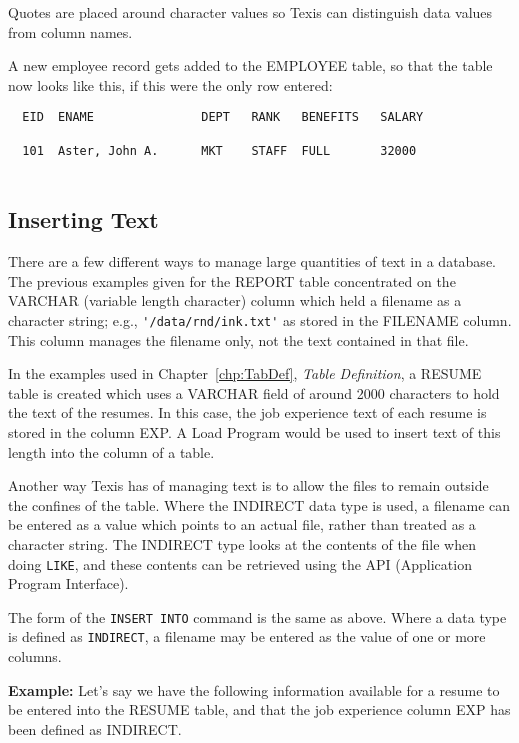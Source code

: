 Quotes are placed around character values so Texis can distinguish
data values from column names.

A new employee record gets added to the EMPLOYEE table, so that the
table now looks like this, if this were the only row entered:

\begin{screen}
\begin{verbatim}
  EID  ENAME               DEPT   RANK   BENEFITS   SALARY

  101  Aster, John A.      MKT    STAFF  FULL       32000


\end{verbatim}
\end{screen}

\subsection{Inserting Text}

There are a few different ways to manage large quantities of text in a
database.  The previous examples given for the REPORT table
concentrated on the VARCHAR (variable length character) column which
held a filename as a character string; e.g., \verb`'/data/rnd/ink.txt'`
as stored in the FILENAME column.  This column manages the filename
only, not the text contained in that file.

In the examples used in Chapter~\ref{chp:TabDef}, {\em Table
Definition}, a RESUME table is created which uses a VARCHAR field of
around 2000 characters to hold the text of the resumes.  In this case,
the job experience text of each resume is stored in the column EXP.  A
Load Program would be used to insert text of this length into the
column of a table.

Another way Texis has of managing text is to allow the files to remain
outside the confines of the table.  Where the INDIRECT data type is
used, a filename can be entered as a value which points to an actual
file, rather than treated as a character string.  The INDIRECT type
looks at the contents of the file when doing \verb`LIKE`, and these contents
can be retrieved using the API (Application Program Interface).

The form of the {\tt INSERT INTO} command is the same as above.  Where a
data type is defined as \verb`INDIRECT`, a filename may be entered as the
value of one or more columns.

{\bf Example:}
Let's say we have the following information available for a resume to
be entered into the RESUME table, and that the job experience column EXP
has been defined as INDIRECT.

